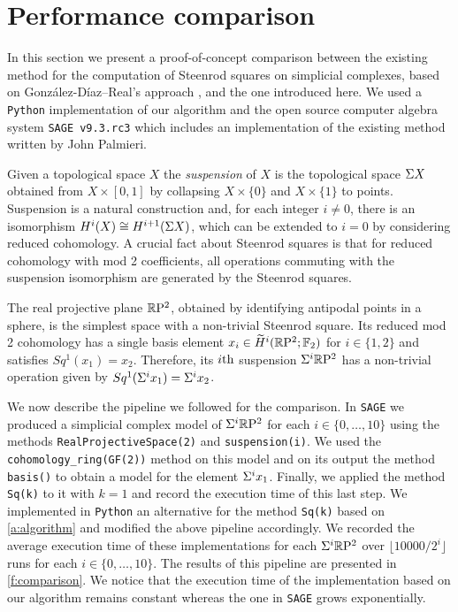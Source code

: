 
\section{Performance comparison} \label{s:comparison}

In this section we present a proof-of-concept comparison between the existing method for the computation of Steenrod squares on simplicial complexes, based on Gonz\'alez-D\'iaz--Real's approach \cite[Corollary 3.2]{gonzalez-diaz1999steenrod}, and the one introduced here.
We used a \verb|Python| implementation of our algorithm and the open source computer algebra system \verb|SAGE v9.3.rc3| \cite{sagemath} which includes an implementation of the existing method written by John Palmieri.

Given a topological space $X$ the \textit{suspension} of $X$ is the topological space $\Sigma X$ obtained from $X \times [0,1]$ by collapsing $X \times \{0\}$ and $X \times \{1\}$ to points.
Suspension is a natural construction and, for each integer $i \neq 0$, there is an isomorphism $H^i(X) \cong H^{i+1}(\Sigma X)$, which can be extended to $i = 0$ by considering reduced cohomology.
A crucial fact about Steenrod squares is that for reduced cohomology with mod 2 coefficients, all operations commuting with the suspension isomorphism are generated by the Steenrod squares.

The real projective plane $\mathbb{R}\mathrm{P}^2$, obtained by identifying antipodal points in a sphere, is the simplest space with a non-trivial Steenrod square.
Its reduced mod 2 cohomology has a single basis element $x_i \in \widetilde{H}^i(\mathbb{R}\mathrm{P}^2; {\mathbb{F}_2})$ for $i \in \{1, 2\}$ and satisfies $Sq^1(x_1) = x_2$.
Therefore, its $i\mathrm{th}$ suspension $\Sigma^i \mathbb{R}\mathrm{P}^2$ has a non-trivial operation given by $Sq^1(\Sigma^i x_1) = \Sigma^i x_2$.

We now describe the pipeline we followed for the comparison.
In \verb|SAGE| we produced a simplicial complex model of $\Sigma^i \mathbb{R}\mathrm{P}^2$ for each $i \in \{0, \dots, 10\}$ using the methods \verb|RealProjectiveSpace(2)| and \verb|suspension(i)|.
We used the \verb|cohomology_ring(GF(2))| method on this model and on its output the method \verb|basis()| to obtain a model for the element $\Sigma^i x_1$.
Finally, we applied the method \verb|Sq(k)| to it with $k=1$ and record the execution time of this last step.
We implemented in \verb|Python| an alternative for the method \verb|Sq(k)| based on \cref{a:algorithm} and modified the above pipeline accordingly.
We recorded the average execution time of these implementations for each $\Sigma^i \mathbb{R}\mathrm{P}^2$ over $\lfloor 10000/2^i \rfloor$ runs for each $i \in \{0, \dots, 10\}$.
The results of this pipeline are presented in \cref{f:comparison}.
We notice that the execution time of the implementation based on our algorithm remains constant whereas the one in \verb|SAGE| grows exponentially.


